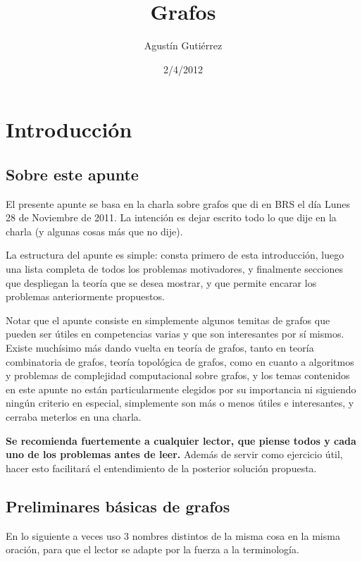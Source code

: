 \documentclass{article}
\title{Grafos}
\author{Agustín Gutiérrez}
\date{2/4/2012}
\begin{document}
\maketitle

\pagebreak

\tableofcontents

\pagebreak

\section{Introducción}

\subsection{Sobre este apunte}

El presente apunte se basa en la charla sobre grafos que di en BRS el día Lunes 28 de Noviembre de 2011. La intención es dejar escrito todo lo que dije en la charla (y algunas cosas más que no dije).

La estructura del apunte es simple: consta primero de esta introducción, luego una lista completa de todos los problemas motivadores, y finalmente secciones que despliegan la teoría que se desea mostrar, y que permite encarar los problemas anteriormente propuestos.

Notar que el apunte consiste en simplemente algunos temitas de grafos que pueden ser útiles en competencias varias y que son interesantes por sí mismos. Existe muchísimo más dando vuelta en teoría de grafos,
tanto en teoría combinatoria de grafos, teoría topológica de grafos, como en cuanto a algoritmos y problemas de complejidad computacional sobre grafos, y los temas contenidos en este apunte no están
particularmente elegidos por su importancia ni siguiendo ningún criterio en especial, simplemente son más o menos útiles e interesantes, y cerraba meterlos en una charla.

\textbf{Se recomienda fuertemente a cualquier lector, que piense todos y cada uno de los problemas antes de leer.} Además de servir como ejercicio útil, hacer esto facilitará el entendimiento de la posterior solución propuesta.

\subsection{Preliminares básicas de grafos}

En lo siguiente a veces uso 3 nombres distintos de la misma cosa en la misma oración, para que el lector se adapte por la fuerza a la terminología.
\end{document}
